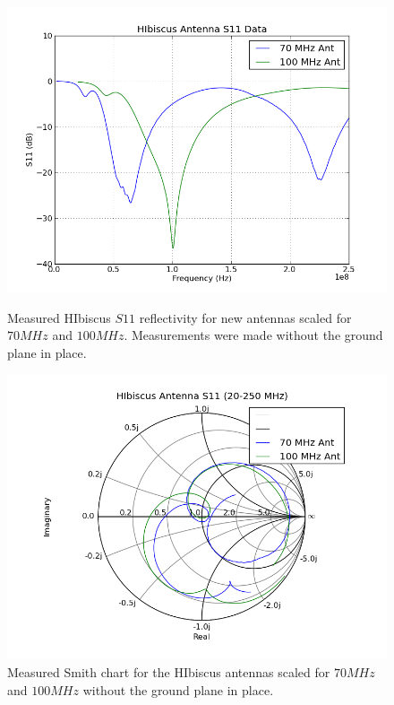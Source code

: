 \begin{figure}[htb]
\centering
\begin{minipage}[b]{0.50\textwidth}
\centering
\includegraphics[width=0.95\linewidth]{SCIHI_system/figures/HIbiscus_S11_dB_both.png}
\caption{Measured HIbiscus $S11$ reflectivity for new antennas scaled for $70 MHz$ and $100 MHz$. Measurements were made without the ground plane in place. }
\label{Fig:HIS11_dB}
\end{minipage}%
\begin{minipage}[b]{0.02\textwidth}
\hspace{1cm}
\end{minipage}%
\begin{minipage}[b]{0.46\textwidth}
\centering
\includegraphics[width=0.95\linewidth]{SCIHI_system/figures/HIbiscus_S11_Smith_both.png}
\caption{Measured Smith chart for the HIbiscus antennas scaled for $70 MHz$ and $100 MHz$ without the ground plane in place.}
\label{Fig:HIS11_Smith}
\end{minipage}
\end{figure}

